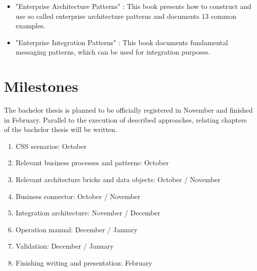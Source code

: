 \documentclass{article}
\begin{document}
\begin{itemize}
    \item "Enterprise Architecture Patterns" \cite{architecturePatterns}: This book presents how to construct and use so 
    called enterprise architecture patterns and documents 13 common examples. 
    \item "Enterprise Integration Patterns" \cite{integrationPatterns}: This book documents fundamental messaging patterns, 
    which can be used for integration purposes.
\end{itemize}

\section{Milestones}

The bachelor thesis is planned to be officially registered in November and finished in February.
Parallel to the execution of described approaches, relating chapters of the bachelor thesis will be written.

\begin{enumerate}
    \item CSS scenarios: October
    \item Relevant business processes and patterns: October
    \item Relevant architecture bricks and data objects: October / November
    \item Business connector: October / November
    \item Integration architecture: November / December
    \item Operation manual: December / January
    \item Validation: December / January
    \item Finishing writing and presentation: February
\end{enumerate}

\printbibliography
\end{document}
